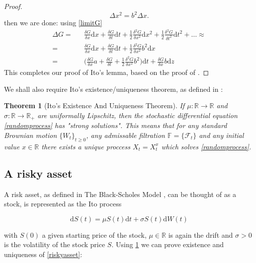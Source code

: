 \documentclass[11pt]{article} %
\newtheorem{theorem}{Theorem}[section]
\begin{document}
\begin{proof}
$$\Delta x^2 = b^2\Delta x.$$ 
 then we are done: using \ref{limitG} 
\begin{align}
    \Delta G =&& \frac{\delta G}{\delta x} \mathrm{d} x + 
    \frac{\delta G}{\delta t} \mathrm{d} t + 
    \frac{1}{2} \frac{\delta^2 G}{\delta x^2} \mathrm{d} x^2 + 
    \frac{1}{2} \frac{\delta^2 G}{\delta t^2} \mathrm{d} t^2 + \dots \approx \\
    =&& \frac{\delta G}{\delta x} \mathrm{d} x + 
    \frac{\delta G}{\delta t} \mathrm{d} t + 
    \frac{1}{2} \frac{\delta^2 G}{\delta x^2} b^2 \mathrm{d} x\\
    =&& \bigg(\frac{\delta G}{\delta x}a+ \frac{\delta G}{\delta t} + \frac{1}{2} 
    \frac{\delta^2 G}{\delta x^2} b^2 \bigg)\mathrm{d}t + \frac{\delta G}{\delta x} 
    b \mathrm{d}z
\end{align}
This completes our proof of Ito's lemma, based on the proof of 
\cite{optionsderivatives}.
\end{proof}

We shall also require Ito's existence/uniqueness theorem, as defined in 
\cite{SDE}:

\begin{theorem}[Ito's Existence And Uniqueness Theorem] 
    \label{isosexistence}
    If $\mu : \mathbb{R} \to \mathbb{R}$ and $\sigma : \mathbb{R} \to \mathbb{R}_+$ 
    are uniformally Lipschitz, then the stochastic differential equation 
    \ref{randomprocess} has "strong solutions". This means that for any standard 
    Brownian motion $\{W_t\}_{t\geq0}$, any admissable filtration $\mathbb{F} = 
    \{\mathcal{F}_t\}$ and any initial value $x \in \mathbb{R}$ there exists a 
    unique proccess $X_t = X_t^x$ which solves \ref{randomprocess}. 

    
\end{theorem}
\subsection{A risky asset}

A risk asset, as defined in The Black-Scholes Model \cite{blackscholes}, 
can be thought of as a stock, is represented as the Ito process

\begin{equation} \label{riskyasset}
    \mathrm{d}S(t) = \mu S(t)\mathrm{d}t + \sigma S(t) \mathrm{d}W(t)
\end{equation}

with $S(0)$ a given starting price of the stock, $\mu \in \mathbb{R}$ 
is again the drift and $\sigma > 0$ is the volatility of the stock 
price $S$. Using \ref{isosexistence} we can prove existence and uniqueness of 
\ref{riskyasset}:
\end{document}
